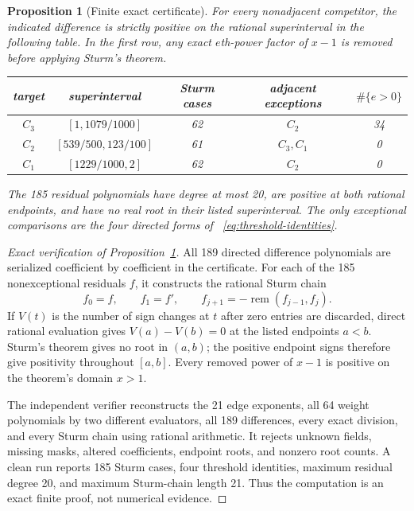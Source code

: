 \documentclass[11pt]{amsart}
\newtheorem{proposition}[theorem]{Proposition}
\theoremstyle{definition}
\begin{document}
\begin{proposition}[Finite exact certificate]\label{prop:certificate}
For every nonadjacent competitor, the indicated difference is strictly
positive on the rational superinterval in the following table.  In the first
row, any exact $e$th-power factor of $x-1$ is removed before applying Sturm's
theorem.
\begin{center}
\begin{tabular}{ccccc}
\toprule
target & superinterval & Sturm cases & adjacent exceptions & $\#\{e>0\}$\\
\midrule
$C_3$ &$[1,1079/1000]$&62&$C_2$&34\\
$C_2$ &$[539/500,123/100]$&61&$C_3,C_1$&0\\
$C_1$ &$[1229/1000,2]$&62&$C_2$&0\\
\bottomrule
\end{tabular}
\end{center}
The 185 residual polynomials have degree at most 20, are positive at both
rational endpoints, and have no real root in their listed superinterval.
The only exceptional comparisons are the four directed forms of
~\eqref{eq:threshold-identities}.
\end{proposition}

\begin{proof}[Exact verification of Proposition~\ref{prop:certificate}]
All 189 directed difference polynomials are serialized coefficient by
coefficient in the certificate.
For each of the 185 nonexceptional residuals $f$, it constructs the rational
Sturm chain
\[
 f_0=f,\qquad f_1=f',\qquad
 f_{j+1}=-\operatorname{rem}(f_{j-1},f_j).
\]
If $V(t)$ is the number of sign changes at $t$ after zero entries are
discarded, direct rational evaluation gives $V(a)-V(b)=0$ at the listed
endpoints $a<b$.  Sturm's theorem gives no root in $(a,b)$; the positive
endpoint signs therefore give positivity throughout $[a,b]$.  Every removed
power of $x-1$ is positive on the theorem's domain $x>1$.

The independent verifier reconstructs the 21 edge exponents, all 64 weight
polynomials by two different evaluators, all 189 differences, every exact
division, and every Sturm chain using rational arithmetic.  It rejects
unknown fields, missing masks, altered coefficients, endpoint roots, and
nonzero root counts.  A clean run reports 185 Sturm cases, four threshold
identities, maximum residual degree 20, and maximum Sturm-chain length 21.
Thus the computation is an exact finite proof, not numerical evidence.
\end{proof}
\end{document}
